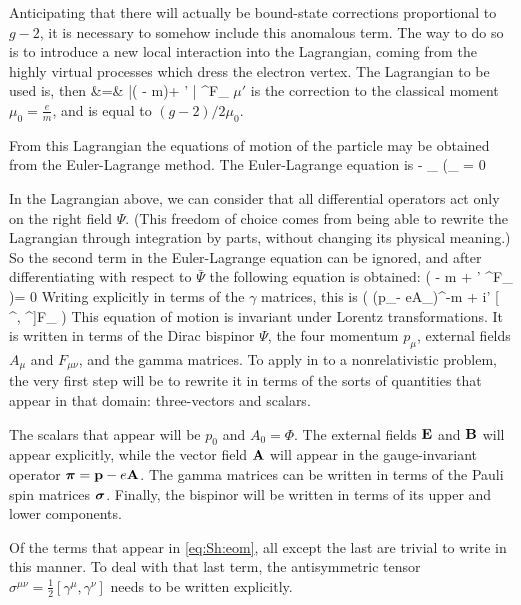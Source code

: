 Anticipating that there will actually be bound-state corrections proportional to $g-2$, it is necessary to somehow include this anomalous term.  The way to do so is to introduce a new local interaction into the Lagrangian, coming from the highly virtual processes which dress the electron vertex.  The Lagrangian to be used is, then
\beqa
{} &=&	
	\bar{\Psi}( - m)\Psi +  \mu' \bar{\Psi} \sigma^{\mu\nu}F_{\mu\nu} \Psi	
\eeqa
$\mu'$ is the correction to the classical moment $\mu_0 = \frac{e}{m}$, and is equal to $(g-2)/2 \mu_0$.


From this Lagrangian the equations of motion of the particle may be obtained from the Euler-Lagrange method.  The Euler-Lagrange equation is
\beq
{} - \partial_\mu {} {\partial (\partial_\mu {\bar{\Psi})} } 
	= 0	
\eeq

In the Lagrangian above, we can consider that all differential operators act only on the right field $\Psi$.  (This freedom of choice comes from being able to rewrite the Lagrangian through integration by parts, without changing its physical meaning.)  So the second term in the Euler-Lagrange equation can be ignored, and after differentiating with respect to $\bar{\Psi}$ the following equation is obtained:
\beq
	( - m +  \mu'  \sigma^{\mu\nu}F_{\mu\nu} )\Psi = 0	
\eeq
Writing explicitly in terms of the $\gamma$ matrices, this is
\beq \label{eq:Sh:eom}
	\left( (p_\mu- eA_\mu)\gamma^\mu -m + i\mu' [ \gamma^\mu, \gamma^\nu]F_{\mu\nu} \right) 
\eeq
This equation of motion is invariant under Lorentz transformations.  It is written in terms of the Dirac bispinor $\Psi$, the four momentum $p_\mu$, external fields $A_\mu$ and $F_{\mu\nu}$, and the gamma matrices.  To apply in to a nonrelativistic problem, the very first step will be to rewrite it in terms of the sorts of quantities that appear in that domain: three-vectors and scalars.

The scalars that appear will be $p_0$ and $A_0 = \Phi$.  The external fields $\mathbf{E}$ and $\mathbf{B}$ will appear explicitly, while the vector field $\mathbf{A}$ will appear in the gauge-invariant operator $\mbox{\boldmath$ \pi $} = \mathbf{p} - e\mathbf{A}$.  The gamma matrices can be written in terms of the Pauli spin matrices $\mbox{\boldmath$ \sigma $}$.  Finally, the bispinor will be written in terms of its upper and lower components.

Of the terms that appear in \eqref{eq:Sh:eom}, all except the last are trivial to write in this manner.  To deal with that last term, the antisymmetric tensor $\sigma^{\mu\nu} =  \frac{1}{2}[\gamma^\mu, \gamma^\nu]$ needs to be written explicitly.

